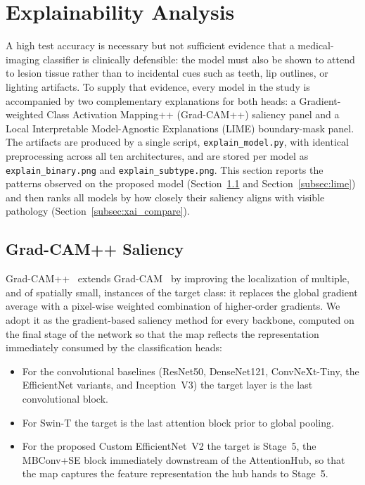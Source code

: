 \section{Explainability Analysis}\label{sec:xai}

A high test accuracy is necessary but not sufficient evidence that a
medical-imaging classifier is clinically defensible: the model must also be
shown to attend to lesion tissue rather than to incidental cues such as teeth,
lip outlines, or lighting artifacts. To supply that evidence, every model in
the study is accompanied by two complementary explanations for both heads:
a Gradient-weighted Class Activation Mapping++ (Grad-CAM++) saliency panel and
a Local Interpretable Model-Agnostic Explanations (LIME) boundary-mask panel.
The artifacts are produced by a single script, \texttt{explain\_model.py}, with
identical preprocessing across all ten architectures, and are stored per model
as \texttt{explain\_binary.png} and \texttt{explain\_subtype.png}. This section
reports the patterns observed on the proposed model
(Section~\ref{subsec:gradcampp} and Section~\ref{subsec:lime}) and then ranks
all models by how closely their saliency aligns with visible pathology
(Section~\ref{subsec:xai_compare}).

\subsection{Grad-CAM++ Saliency}\label{subsec:gradcampp}

Grad-CAM++~\cite{chattopadhyay2018gradcampp} extends
Grad-CAM~\cite{selvaraju2017gradcam} by improving the localization of multiple,
and of spatially small, instances of the target class: it replaces the global
gradient average with a pixel-wise weighted combination of higher-order
gradients. We adopt it as the gradient-based saliency method for every backbone,
computed on the final stage of the network so that the map reflects the
representation immediately consumed by the classification heads:

\begin{itemize}
  \item For the convolutional baselines (ResNet50, DenseNet121,
  ConvNeXt-Tiny, the EfficientNet variants, and Inception~V3) the target layer
  is the last convolutional block.
  \item For Swin-T the target is the last attention block prior to global
  pooling.
  \item For the proposed Custom EfficientNet~V2 the target is Stage~5, the
  MBConv+SE block immediately downstream of the AttentionHub, so that the
  map captures the feature representation the hub hands to Stage~5.
\end{itemize}

